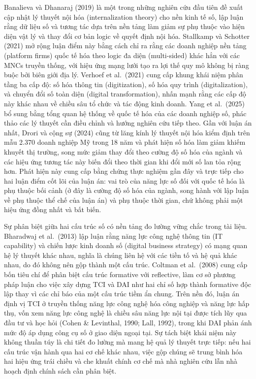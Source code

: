 \documentclass[
  a4paper,
  13pt]{extreport}
\begin{document}
Banalieva và Dhanaraj (2019) là một trong những nghiên cứu đầu tiên đề
xuất cập nhật lý thuyết nội hóa (internalization theory) cho nền kinh tế
số, lập luận rằng dữ liệu số và tương tác dựa trên nền tảng làm giảm sự
phụ thuộc vào hiện diện vật lý và thay đổi cơ bản logic về quyết định
nội hóa. Stallkamp và Schotter (2021) mở rộng luận điểm này bằng cách
chỉ ra rằng các doanh nghiệp nền tảng (platform firms) quốc tế hóa theo
logic đa diện (multi-sided) khác hẳn với các MNCs truyền thống, với hiệu
ứng mạng lưới tạo ra lợi thế quy mô không bị ràng buộc bởi biên giới địa
lý. Verhoef et al.~(2021) cung cấp khung khái niệm phân tầng ba cấp độ:
số hóa thông tin (digitization), số hóa quy trình (digitalization), và
chuyển đổi số toàn diện (digital transformation), nhấn mạnh rằng các cấp
độ này khác nhau về chiều sâu tổ chức và tác động kinh doanh. Yang et
al.~(2025) bổ sung bằng tổng quan hệ thống về quốc tế hóa của các doanh
nghiệp số, phác thảo các lý thuyết cần điều chỉnh và hướng nghiên cứu
tiếp theo. Gần với luận án nhất, Drori và cộng sự (2024) cũng từ lăng
kính lý thuyết nội hóa kiểm định trên mẫu 2.370 doanh nghiệp Mỹ trong 18
năm và phát hiện số hóa làm giảm khiếm khuyết thị trường, song mức giảm
thay đổi theo cường độ số hóa của ngành và các hiệu ứng tương tác này
biến đổi theo thời gian khi đổi mới số lan tỏa rộng hơn. Phát hiện này
cung cấp bằng chứng thực nghiệm gần đây và trực tiếp cho hai luận điểm
cốt lõi của luận án: vai trò của năng lực số đối với quốc tế hóa là phụ
thuộc bối cảnh (ở đây là cường độ số hóa của ngành, song hành với lập
luận về phụ thuộc thể chế của luận án) và phụ thuộc thời gian, chứ không
phải một hiệu ứng đồng nhất và bất biến.

Sự phân biệt giữa hai cấu trúc số có nền tảng đo lường vững chắc trong
tài liệu. Bharadwaj et al.~(2013) lập luận rằng năng lực công nghệ thông
tin (IT capability) và chiến lược kinh doanh số (digital business
strategy) có mạng quan hệ lý thuyết khác nhau, nghĩa là chúng liên hệ
với các tiền tố và hệ quả khác nhau, do đó không nên gộp thành một cấu
trúc. Coltman et al.~(2008) cung cấp bốn tiêu chí để phân biệt cấu trúc
formative với reflective, làm cơ sở phương pháp luận cho việc xây dựng
TCI và DAI như hai chỉ số hợp thành formative độc lập thay vì các chỉ
báo của một cấu trúc tiềm ẩn chung. Trên nền đó, luận án định vị TCI ở
truyền thống năng lực công nghệ hóa công nghiệp và năng lực hấp thụ, vốn
xem năng lực công nghệ là chiều sâu năng lực nội tại được tích lũy qua
đầu tư và học hỏi (Cohen \& Levinthal, 1990; Lall, 1992), trong khi DAI
phản ánh mức độ áp dụng công cụ số ở giao diện ngoại tại. Sự tách biệt
khái niệm này không thuần túy là chi tiết đo lường mà mang hệ quả lý
thuyết trực tiếp: nếu hai cấu trúc vận hành qua hai cơ chế khác nhau,
việc gộp chúng sẽ trung bình hóa hai hiệu ứng trái chiều và che khuất
chính cơ chế mà nhà nghiên cứu lẫn nhà hoạch định chính sách cần phân
biệt.
\end{document}
